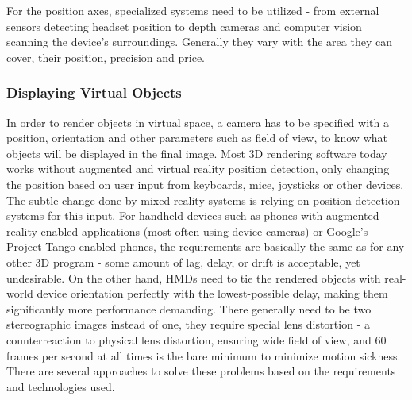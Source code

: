 \documentclass[12pt, a4paper]{article}
\begin{document}
For the position axes, specialized systems need to be utilized - from external sensors detecting headset position to depth cameras and computer vision scanning the device’s surroundings. Generally they vary with the area they can cover, their position, precision and price.


\subsubsection{Displaying Virtual Objects}
In order to render objects in virtual space, a camera has to be specified with a position, orientation and other parameters such as field of view, to know what objects will be displayed in the final image. Most 3D rendering software today works without augmented and virtual reality position detection, only changing the position based on user input from keyboards, mice, joysticks or other devices. The subtle change done by mixed reality systems is relying on position detection systems for this input. For handheld devices such as phones with augmented reality-enabled applications (most often using device cameras) or Google’s Project Tango-enabled phones, the requirements are basically the same as for any other 3D program - some amount of lag, delay, or drift is acceptable, yet undesirable. On the other hand, HMDs need to tie the rendered objects with real-world device orientation perfectly with the lowest-possible delay, making them significantly more performance demanding. There generally need to be two stereographic images instead of one, they require special lens distortion - a counterreaction to physical lens distortion, ensuring wide field of view, and 60 frames per second at all times is the bare minimum to minimize motion sickness. There are several approaches to solve these problems based on the requirements and technologies used.
\end{document}
